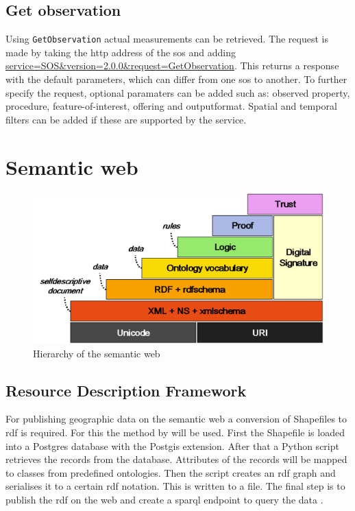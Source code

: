 
\subsection{Get observation}

Using \texttt{GetObservation} actual measurements can be retrieved. The request is made by taking the \ac{http} address of the \ac{sos} and adding \url{service=SOS\&version=2.0.0\&request=GetObservation}. This returns a response with the default parameters, which can differ from one \ac{sos} to another. To further specify the request, optional paramaters can be added such as: observed property, procedure, feature-of-interest, offering and outputformat. Spatial and temporal filters can be added if these are supported by the service. 


\section{Semantic web}

\begin{figure}
	\centering
	\includegraphics[width=0.7\linewidth]{figs/semanticweb.png}
	\caption{Hierarchy of the semantic web \citep{LD:Koivunen}}
	\label{fig:SemanticWeb}
\end{figure}

\subsection{Resource Description Framework}
For publishing geographic data on the semantic web a conversion of Shapefiles to \ac{rdf} is required. For this the method by \cite{LD:Missier} will be used. First the Shapefile is loaded into a Postgres database with the Postgis extension. After that a Python script retrieves the records from the database. Attributes of the records will be mapped to classes from predefined ontologies. Then the script creates an \ac{rdf} graph and serialises it to a certain \ac{rdf} notation. This is written to a file. The final step is to publish the \ac{rdf} on the web and create a \ac{sparql} endpoint to query the data \citep{LD:Missier}. 

